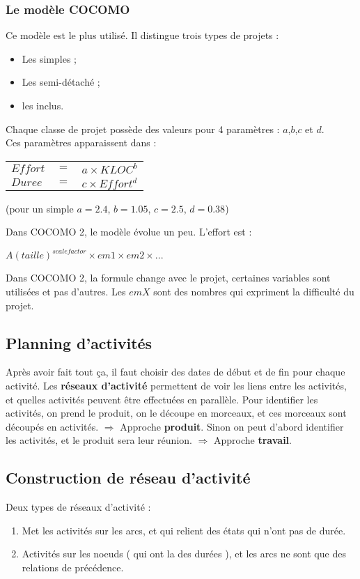 \subsubsection{Le modèle COCOMO}
Ce modèle est le plus utilisé. Il distingue trois types de projets :
\begin{itemize}
	\item Les simples ;
   	\item Les semi-détaché ;
    \item les inclus.
\end{itemize}
Chaque classe de projet possède des valeurs pour 4 paramètres : $a$,$b$,$c$ et $d$.\\
Ces paramètres apparaissent dans :
\begin{center}
    \begin{tabular}{|lll}
        $Effort$ & $=$ & $a \times KLOC^b$\\
        $Duree$  & $=$ & $c \times Effort^d$
    \end{tabular}
    (pour un simple $a=2.4$, $b=1.05$, $c=2.5$, $d=0.38$)
\end{center}
Dans COCOMO 2, le modèle évolue un peu. L’effort est :
\begin{center}
$A(taille)^{scalefactor} \times em1 \times em2 \times ...$
\end{center}
Dans COCOMO 2, la formule change avec le projet, certaines variables sont utilisées et pas d’autres. Les $emX$ sont des nombres qui expriment la difficulté du projet.



\subsection{Planning d’activités}
Après avoir fait tout ça, il faut choisir des dates de début et de fin pour chaque activité.
Les \textbf{réseaux d’activité} permettent de voir les liens entre les activités, et quelles activités peuvent être effectuées en parallèle.
Pour identifier les activités, on prend le produit, on le découpe en morceaux, et ces morceaux sont découpés en activités. $\Rightarrow$ Approche \textbf{produit}.
Sinon on peut d’abord identifier les activités, et le produit sera leur réunion. $\Rightarrow$ Approche \textbf{travail}.



\subsection{Construction de réseau d’activité}
Deux types de réseaux d’activité :
\begin{enumerate}
	\item Met les activités sur les arcs, et qui relient des états qui n’ont pas de durée.
	\item Activités sur les noeuds ( qui ont la des durées ), et les arcs ne sont que des relations de précédence.
\end{enumerate}

